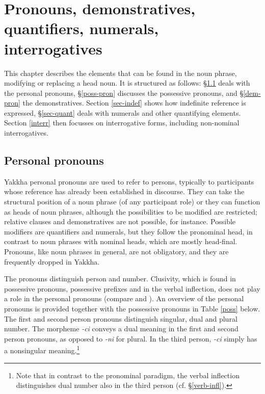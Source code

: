 ﻿\chapter{Pronouns, demonstratives, quantifiers, numerals, interrogatives}\label{ch-pron}
  
This chapter describes the elements that can be found in the noun phrase,  mo\-di\-fying or replacing a head noun. It is structured as follows: §\ref{pers-pron} deals with the personal pronouns, §\ref{poss-pron} discusses the possessive pronouns, and  §\ref{dem-pron} the demonstratives. Section \ref{sec-indef} shows how indefinite reference is expressed, §\ref{sec-quant} deals with numerals and other quantifying elements. Section \ref{interr} then focusses on interrogative forms, including non-nominal interrogatives. 
  
\section{Personal pronouns}\label{pers-pron}

Yakkha personal pronouns are used to refer to persons, typically to participants whose reference has already been established in discourse. They can take the structural position of a noun phrase (of any participant role) or they can function as  heads of noun phrases, although the possibilities to be modified are restricted; relative clauses and demonstratives are not possible, for instance. Possible modifiers are quantifiers and numerals, but they follow the pronominal head, in contrast to noun phrases with nominal heads, which are mostly head-final. Pronouns, like noun phrases in general, are not obligatory, and they are frequently dropped in Yakkha.

The pronouns distinguish person and number. Clusivity, which is found  in possessive pronouns, possessive prefixes and in the verbal inflection,  does not play a role in the personal pronouns (compare \Next[a] and \Next[b]). An overview of the personal pronouns is provided together with the possessive pronouns in Table \ref{poss} below. The first and second person pronouns distinguish singular, dual and plural number. The morpheme \emph{-ci} conveys a dual meaning in the first and second person pronouns, as opposed to \emph{-ni} for plural. In the third person, \emph{-ci} simply has a nonsingular meaning.\footnote{Note that in contrast to the pronominal paradigm, the verbal inflection distinguishes dual number also in the third person (cf.  §\ref{verb-infl}).} 



